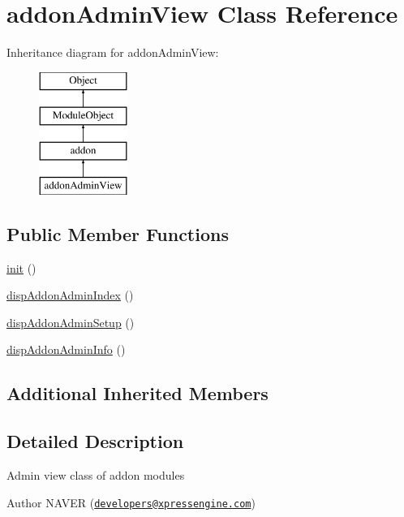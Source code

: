 \hypertarget{classaddonAdminView}{\section{addon\+Admin\+View Class Reference}
\label{classaddonAdminView}
}
Inheritance diagram for addon\+Admin\+View\+:\begin{figure}[H]
\begin{center}
\leavevmode
\includegraphics[height=4.000000cm]{classaddonAdminView}
\end{center}
\end{figure}
\subsection*{Public Member Functions}
\begin{DoxyCompactItemize}
\item 
\hyperlink{classaddonAdminView_a2a2cd475d7a4d6111e7e9b3dafb4de01}{init} ()
\item 
\hyperlink{classaddonAdminView_ac460e3c832e8209833bd5f50ab41910c}{disp\+Addon\+Admin\+Index} ()
\item 
\hyperlink{classaddonAdminView_a14aef8b4e451f5eac1872ddc00530d50}{disp\+Addon\+Admin\+Setup} ()
\item 
\hyperlink{classaddonAdminView_a90e6af25e34c4834bd43633da6d83b60}{disp\+Addon\+Admin\+Info} ()
\end{DoxyCompactItemize}
\subsection*{Additional Inherited Members}


\subsection{Detailed Description}
Admin view class of addon modules \begin{DoxyAuthor}{Author}
N\+A\+V\+E\+R (\href{mailto:developers@xpressengine.com}{\tt developers@xpressengine.\+com}) 
\end{DoxyAuthor}



